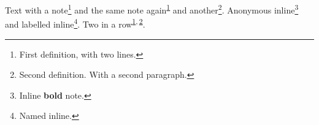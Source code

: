 \documentclass[11pt]{article}
\date{\today}
\title{}
\begin{document}
\tableofcontents

Text with a note\footnote{First definition,
with two lines.\label{org7bfd295}} and the same note again\textsuperscript{\ref{org7bfd295}} and another\footnote{Second definition.
With a second paragraph.\label{orgaf3ed89}}.
Anonymous inline\footnote{Inline \textbf{bold} note.} and labelled inline\footnote{Named inline.}.
Two in a row\textsuperscript{\ref{org7bfd295}}\textsuperscript{,}\,\textsuperscript{\ref{orgaf3ed89}}.
\end{document}
